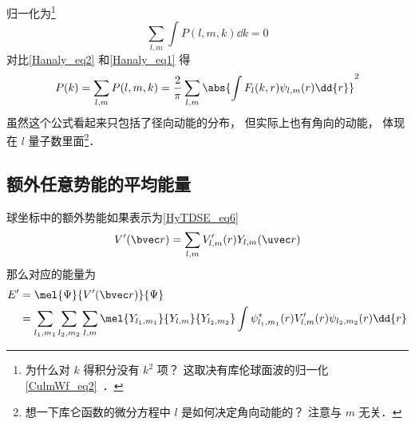 归一化为\footnote{为什么对 $k$ 得积分没有 $k^2$ 项？ 这取决有库伦球面波的归一化\autoref{CulmWf_eq2}~．}
\begin{equation}
\sum_{l,m} \int P(l, m, k) \dd{k} = 0
\end{equation}
对比\autoref{Hanaly_eq2} 和\autoref{Hanaly_eq1} 得
\begin{equation}
P(k) = \sum_{l,m} P(l, m, k) = \frac{2}{\pi} \sum_{l,m} \abs{\int F_l(k, r) \psi_{l,m}(r) \dd{r}}^2
\end{equation}
虽然这个公式看起来只包括了径向动能的分布， 但实际上也有角向的动能， 体现在 $l$ 量子数里面\footnote{想一下库仑函数的微分方程中 $l$ 是如何决定角向动能的？ 注意与 $m$ 无关．}．

\subsection{额外任意势能的平均能量}
球坐标中的额外势能如果表示为\autoref{HyTDSE_eq6}~
\begin{equation}
V'(\bvec r) = \sum_{l,m} V'_{l,m}(r) Y_{l,m}(\uvec r)
\end{equation}
那么对应的能量为
\begin{equation}\label{Hanaly_eq3}
\begin{aligned}
E' &= \mel{\Psi}{V'(\bvec r)}{\Psi}\\
&= \sum_{l_1,m_1}\sum_{l_2,m_2}\sum_{l,m} \mel{Y_{l_1,m_1}}{Y_{l,m}}{Y_{l_2,m_2}} \int \psi_{l_1,m_1}^*(r) V'_{l,m}(r) \psi_{l_2,m_2}(r) \dd{r}
\end{aligned}
\end{equation}
